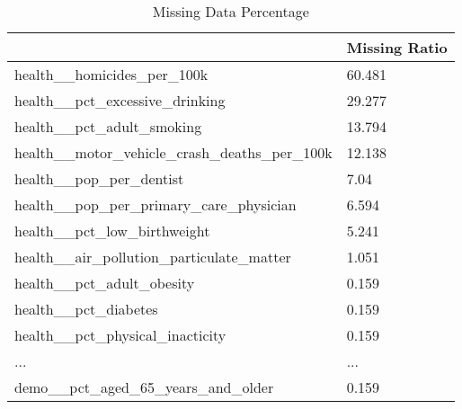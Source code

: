 \begin{table}[]
\small
\caption{Missing Data Percentage} \label{tab:data_01}
\centering
\begin{tabular}{ll}
\hline
                                                   & Missing Ratio \\ \hline
health\_\_homicides\_per\_100k                     & 60.481        \\
health\_\_pct\_excessive\_drinking                 & 29.277        \\
health\_\_pct\_adult\_smoking                      & 13.794        \\
health\_\_motor\_vehicle\_crash\_deaths\_per\_100k & 12.138        \\
health\_\_pop\_per\_dentist                        & 7.04          \\
health\_\_pop\_per\_primary\_care\_physician       & 6.594         \\
health\_\_pct\_low\_birthweight                    & 5.241         \\
health\_\_air\_pollution\_particulate\_matter      & 1.051         \\
health\_\_pct\_adult\_obesity                      & 0.159         \\
health\_\_pct\_diabetes                            & 0.159         \\
health\_\_pct\_physical\_inacticity                & 0.159         \\
...												  & ...           \\
demo\_\_pct\_aged\_65\_years\_and\_older           & 0.159         \\
\hline
\end{tabular}
\end{table}